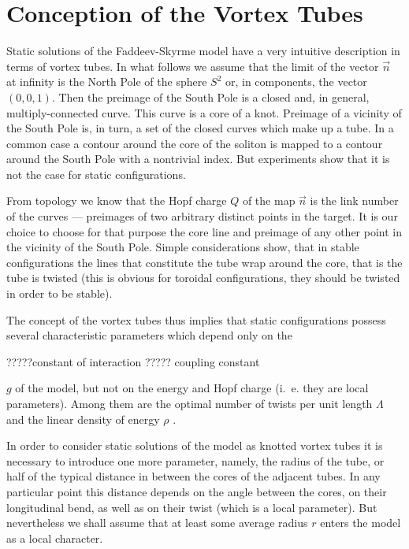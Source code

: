 \documentclass[a4paper,12pt]{article}
\begin{document}
\section{Conception of the Vortex Tubes}
        Static solutions of the Faddeev-Skyrme model have a very 
        intuitive description in terms of vortex tubes.
        In what follows we assume that the limit of the vector 
    $ \vec{n} $
        at infinity is the North Pole of the sphere 
    $ S^{2} $
        or, in components, the vector 
    $ (0,0,1) $.
        Then the preimage of the South Pole is a closed and, in general,
        multiply-connected curve. This curve is a core of a knot.
        Preimage of a vicinity of the South Pole is, in turn, a set
        of the closed curves which make up a tube. In a common case
        a contour around the core of the soliton
        is mapped to a contour around the South Pole with a nontrivial index.
        But experiments 
\cite{}
        show that it is not the case for static
        configurations.

        From topology we know that the Hopf charge 
    $ Q $
        of the map 
    $ \vec{n} $
        is the link number of the curves --- preimages of two arbitrary
        distinct points in the target. It is our choice to choose for that
        purpose the core line and preimage of any other point in the vicinity
        of the South Pole.
        Simple considerations show, that in stable configurations the
        lines that constitute the tube wrap around the core, that is the
        tube is twisted (this is obvious for toroidal configurations,
	they should be twisted in order to be stable).

        The concept of the vortex tubes thus implies that static
        configurations  possess several characteristic parameters
        which depend only on the 

?????constant of interaction ?????
	coupling constant

    $ g $
        of the model, but not on the energy and Hopf charge (i.~e. they
        are local parameters). Among them are the optimal number of twists
        per unit length 
    $ \Lambda $
        and the linear density of energy 
    $ \rho $
\cite{NS}.

        In order to consider static solutions of the model as knotted
        vortex tubes it is necessary to introduce one more parameter,
        namely, the radius of the tube, or half of the typical 
        distance in between the cores of the adjacent tubes.
        In any particular point this distance depends on the angle
        between the cores, on their longitudinal bend, as well as on
        their twist (which is a local parameter). But nevertheless we 
	shall assume that at least some average radius
    $ r $
        enters the model as a local character.
\end{document}
